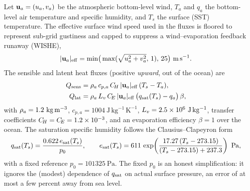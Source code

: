 Let $\mathbf{u}_a=(u_a,v_a)$ be the atmospheric bottom-level wind, $T_a$ and $q_a$
the bottom-level air temperature and specific humidity, and $T_s$ the surface
(SST) temperature. The effective surface wind speed used in the fluxes is floored
to represent sub-grid gustiness and capped to suppress a wind--evaporation
feedback runaway (WISHE),
\begin{equation}
  |\uvec_a|_{\mathrm{eff}} = \min\!\big(\max(\sqrt{\uu_a^2+\vv_a^2},\,1),\,25\big)\ \mathrm{m\,s^{-1}}.
  \label{eq:windeff}
\end{equation}
The sensible and latent heat fluxes (positive \emph{upward}, out of the ocean) are
\begin{align}
  Q_{\mathrm{sens}} &= \rho_a\,c_{p,a}\,C_{\!H}\,|\mathbf{u}_a|_{\mathrm{eff}}\,(T_s - T_a),
  \label{eq:sens}\\
  Q_{\mathrm{lat}}  &= \rho_a\,L_v\,C_{\!E}\,|\mathbf{u}_a|_{\mathrm{eff}}\,\big(q_{\mathrm{sat}}(T_s) - q_a\big)\,\beta,
  \label{eq:lat}
\end{align}
with $\dens_a=1.2\ \mathrm{kg\,m^{-3}}$, $c_{p,a}=1004\ \mathrm{J\,kg^{-1}\,K^{-1}}$,
$\Lvap=2.5\times10^6\ \mathrm{J\,kg^{-1}}$, transfer coefficients
$C_{\!H}=C_{\!E}=1.2\times10^{-3}$, and an evaporation efficiency $\beta=1$ over the
ocean. The saturation specific humidity follows the Clausius--Clapeyron form
\begin{equation}
  \qsat(T_s) = \frac{0.622\,e_{\mathrm{sat}}(T_s)}{p_0},
  \qquad
  e_{\mathrm{sat}}(T_s) = 611\,\exp\!\left(\frac{17.27\,(T_s-273.15)}{(T_s-273.15)+237.3}\right)\ \mathrm{Pa},
  \label{eq:qsat}
\end{equation}
with a fixed reference $p_0=101325\ \mathrm{Pa}$. The fixed $p_0$ is an honest
simplification: it ignores the (modest) dependence of $q_{\mathrm{sat}}$ on actual surface
pressure, an error of at most a few percent away from sea level.

